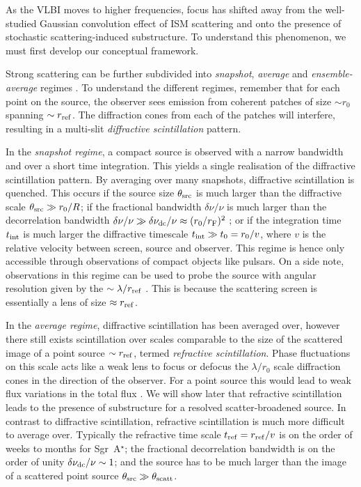 As the VLBI moves to higher frequencies, focus has shifted away from the well-studied Gaussian convolution effect of ISM scattering and onto the presence of stochastic scattering-induced substructure. To understand this phenomenon, we must first develop our conceptual framework. 

Strong scattering can be further subdivided into \emph{snapshot}, \emph{average} and \emph{ensemble-average} regimes \citep*{Narayan_1989,Goodman_1989}. To understand the different regimes, remember that for each point on the source, the observer sees emission from coherent patches of size $\sim r_0$ spanning $\sim r_{\rm ref}$. The diffraction cones from each of the patches will interfere, resulting in a multi-slit \emph{diffractive scintillation} pattern. 

In the \emph{snapshot regime}, a compact source is observed with a narrow bandwidth and over a short time integration. This yields a single realisation of the diffractive scintillation pattern. By averaging over many snapshots, diffractive scintillation is quenched. This occurs if the source size $\theta_{\rm src}$ is much larger than the diffractive scale $\theta_{\rm src} \gg r_0/R$; if the fractional bandwidth $\delta \nu/\nu$ is much larger than the decorrelation bandwidth $\delta \nu/\nu \gg \delta \nu_{\rm dc}/\nu \approx (r_0/r_{\rm F})^2$ \citep{Narayan_1992}; or if the integration time $t_{\rm int}$ is much larger the diffractive timescale $t_{\rm int} \gg t_{\rm 0} = r_0/v$, where $v$ is the relative velocity between screen, source and observer. This regime is hence only accessible through observations of compact objects like pulsars. On a side note, observations in this regime can be used to probe the source with angular resolution given by the $\sim \lambda /r_{\rm ref}$ \citep[e.g.][]{Gwinn_2012}. This is because the scattering screen is essentially a lens of size $\approx r_{\rm ref}$.

In the \emph{average regime}, diffractive scintillation has been averaged over, however there still exists scintillation over scales comparable to the size of the scattered image of a point source $\sim r_{\rm ref}$, termed \emph{refractive scintillation}. Phase fluctuations on this scale acts like a weak lens to focus or defocus the $\lambda/ r_0$ scale diffraction cones in the direction of the observer. For a point source this would lead to weak flux variations in the total flux \citep{Narayan_1992}. We will show later that refractive scintillation leads to the presence of substructure for a resolved scatter-broadened source. In contrast to diffractive scintillation, refractive scintillation is much more difficult to average over. Typically the refractive time scale $t_{\rm ref} = r_{\rm ref}/v$ is on the order of weeks to months for Sgr~A$^\star$; the fractional decorrelation bandwidth is on the order of unity $\delta \nu_{\rm dc}/\nu \sim 1$; and the source has to be much larger than the image of a scattered point source $\theta_{\rm src} \gg \theta_{\rm scatt}$. 

